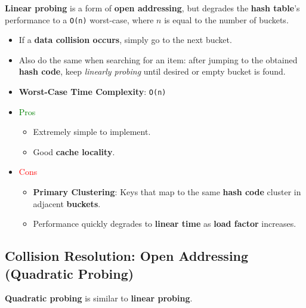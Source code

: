 \documentclass[12pt, letterpaper]{article}
\begin{document}
\textbf{Linear probing} is a form of \textbf{open addressing}, but degrades the \textbf{hash table}'s performance to a \texttt{O(n)} worst-case, where $ n $ is equal to the number of buckets.

\begin{itemize}
    \item If a \textbf{data collision occurs}, simply go to the next bucket.
    \item Also do the same when searching for an item: after jumping to the obtained \textbf{hash code}, keep \textit{linearly probing} until desired or empty bucket is found.
    \item \textbf{Worst-Case Time Complexity}: \texttt{O(n)}
    \item \textcolor{green}{Pros}
        \begin{itemize}
            \item Extremely simple to implement.
            \item Good \textbf{cache locality}.
        \end{itemize}
    \item \textcolor{red}{Cons}
        \begin{itemize}
            \item \textbf{Primary Clustering}: Keys that map to the same \textbf{hash code} cluster in adjacent \textbf{buckets}.
            \item Performance quickly degrades to \textbf{linear time} as \textbf{load factor} increases.
        \end{itemize}
\end{itemize}

\subsection*{Collision Resolution: Open Addressing (Quadratic Probing)}

\textbf{Quadratic probing} is similar to \textbf{linear probing}.
\end{document}
